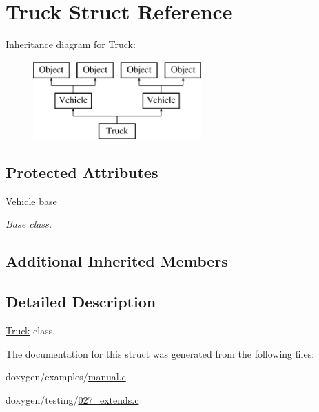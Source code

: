 \hypertarget{struct_truck}{}\section{Truck Struct Reference}
\label{struct_truck}
Inheritance diagram for Truck\+:\begin{figure}[H]
\begin{center}
\leavevmode
\includegraphics[height=3.000000cm]{struct_truck}
\end{center}
\end{figure}
\subsection*{Protected Attributes}
\begin{DoxyCompactItemize}
\item 
\mbox{\label{struct_truck_ad0ac321609dda1a6c552488b05ec7ac8}} 
\mbox{\hyperlink{struct_vehicle}{Vehicle}} \mbox{\hyperlink{struct_truck_ad0ac321609dda1a6c552488b05ec7ac8}{base}}
\begin{DoxyCompactList}\small\item\em Base class. \end{DoxyCompactList}\end{DoxyCompactItemize}
\subsection*{Additional Inherited Members}


\subsection{Detailed Description}
\mbox{\hyperlink{struct_truck}{Truck}} class. 

The documentation for this struct was generated from the following files\+:\begin{DoxyCompactItemize}
\item 
doxygen/examples/\mbox{\hyperlink{manual_8c}{manual.\+c}}\item 
doxygen/testing/\mbox{\hyperlink{027__extends_8c}{027\+\_\+extends.\+c}}\end{DoxyCompactItemize}
